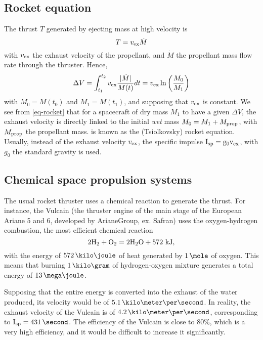 \subsection*{Rocket equation}
The thrust $T$ generated by ejecting mass at high velocity is
\begin{equation} \label{eq-thurst}
  T = v_{\rm ex} \dot{M}
\end{equation}
with $v_{\rm ex}$ the exhaust velocity of the propellant, and $\dot{M}$ the propellant mass flow rate through the thruster.
Hence,
\begin{equation} \label{eq-rocket}
  \Delta V = \int_{t_1}^{t_2} v_{\rm ex} \frac{ \lvert\dot{M}\rvert}{M(t)} dt = v_{\rm ex} \ln \left( \frac{M_0}{M_1} \right)
\end{equation}
with $M_0 = M(t_0)$ and $M_1=M(t_1)$, and supposing that $v_{\rm ex}$ is constant.
We see from \cref{eq-rocket} that for a spacecraft of dry mass $M_1$ to have a given $\Delta V$, the exhaust velocity is directly linked to the initial \emph{wet} mass $M_0 = M_1 + M_{\rm prop}$, with $M_{\rm prop}$ the propellant mass.
 is known as the (Tsiolkovsky) rocket equation.
Usually, instead of the exhaust velocity $v_{\rm ex}$, the specific impulse $\rm I_{\rm sp} = g_0 v_{\rm ex}$, with $g_0$ the standard gravity is used.

\subsection*{Chemical space propulsion systems}
The usual rocket thruster uses a chemical reaction to generate the thrust.
For instance, the Vulcain (the thruster engine of the main stage of the European Ariane 5 and 6, developed by ArianeGroup, ex. Safran) uses the oxygen-hydrogen combustion, the most efficient chemical reaction \citep{nasa-H2O2}
\begin{equation*}
  2 {\rm H_2} + { \rm O_2} = 2 {\rm H_2 O} + 572 \text{~kJ},
\end{equation*}
with the energy of $572\,\kilo\joule$ of heat generated by $1\,\mole$ of oxygen.
This means that burning $1\,\kilo\gram$ of hydrogen-oxygen mixture generates a total energy of $13\,\mega\joule$. 

Supposing that the entire energy is converted into the exhaust of the water produced, its velocity would be of $5.1 \,\kms$.
In reality, the exhaust velocity of the Vulcain is of $4.2 \,\kms$, corresponding to $\Isp=431 \,\second$.
The efficiency of the Vulcain is close to 80\%, which is a very high efficiency, and it would be difficult to increase it significantly. 

